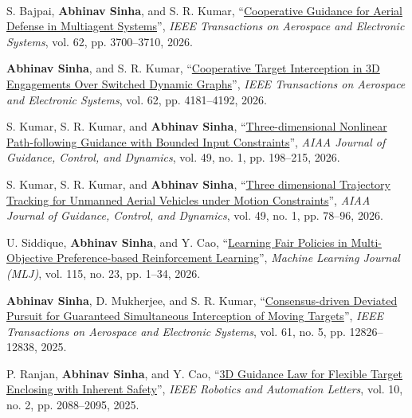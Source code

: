 

\vspace*{.5em}
	\\
	\renewcommand{\labelenumi}{[\textbf{J\arabic{enumi}}]}
	\begin{etaremune}[leftmargin=1cm]
		\item S. Bajpai, \textbf{Abhinav Sinha}, and S. R. Kumar, ``\href{https://ieeexplore.ieee.org/document/11320436}{Cooperative Guidance for Aerial Defense in Multiagent Systems}'', \emph{IEEE Transactions on Aerospace and Electronic Systems}, vol. 62, pp. 3700--3710, 2026.
		\item \textbf{Abhinav Sinha}, and S. R. Kumar, ``\href{https://doi.org/10.1109/TAES.2026.3651410}{Cooperative Target Interception in 3D Engagements Over Switched Dynamic Graphs}'', \emph{IEEE Transactions on Aerospace and Electronic Systems}, vol. 62, pp. 4181--4192, 2026.
		\item S. Kumar, S. R. Kumar, and \textbf{Abhinav Sinha}, ``\href{https://arc.aiaa.org/doi/abs/10.2514/1.G008792}{Three-dimensional Nonlinear Path-following Guidance with Bounded Input Constraints}'', \emph{AIAA Journal of Guidance, Control, and Dynamics}, vol. 49, no. 1, pp. 198--215, 2026.
		\item S. Kumar, S. R. Kumar, and \textbf{Abhinav Sinha}, ``\href{https://arc.aiaa.org/doi/abs/10.2514/1.G009445}{Three dimensional Trajectory Tracking for Unmanned Aerial Vehicles under Motion Constraints}'', \emph{AIAA Journal of Guidance, Control, and Dynamics}, vol. 49, no. 1, pp. 78--96, 2026.
		\item U. Siddique, \textbf{Abhinav Sinha}, and Y. Cao, ``\href{https://doi.org/10.1007/s10994-025-06959-y}{Learning Fair Policies in Multi-Objective Preference-based Reinforcement Learning}'', \emph{Machine Learning Journal (MLJ)}, vol. 115, no. 23, pp. 1--34, 2026.
		\item \textbf{Abhinav Sinha}, D. Mukherjee, and S. R. Kumar, ``\href{https://ieeexplore.ieee.org/abstract/document/11018241}{Consensus-driven Deviated Pursuit for Guaranteed Simultaneous Interception of Moving Targets}'', \emph{IEEE Transactions on Aerospace and Electronic Systems}, vol. 61, no. 5, pp. 12826--12838, 2025.
		\item P. Ranjan, \textbf{Abhinav Sinha}, and Y. Cao, ``\href{https://ieeexplore.ieee.org/document/10839025}{3D Guidance Law for Flexible Target Enclosing with Inherent Safety}'', \emph{IEEE Robotics and Automation Letters}, vol. 10, no. 2, pp. 2088--2095, 2025.

\end{etaremune}
